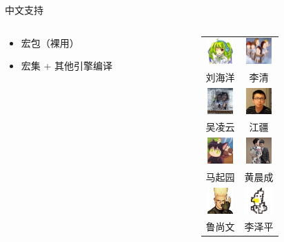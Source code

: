 \begin{frame}{中文支持}
\begin{columns}
\begin{column}{0.65\textwidth}
\begin{itemize}
      \begin{itemize}
        \item {} 宏包（裸用）
        \item {} 宏集 + 其他引擎编译
      \end{itemize}
  \end{itemize}
\end{column} \pause
\begin{column}{0.33\textwidth}
  \tiny
  \begin{tabular}{cc}
    \includegraphics[width=1cm]{figures/leoliu.png}        &
    \includegraphics[width=1cm]{figures/qinglee.jpg}       \\
    刘海洋 & 李清 \\[2ex]
    \includegraphics[width=1cm]{figures/wulingyun.jpg}     &
    \includegraphics[width=1cm]{figures/jjgod.jpg}         \\
    吴凌云 & 江疆 \\[2ex]
    \includegraphics[width=1cm]{figures/li-a-ling.jpg}     &
    \includegraphics[width=1cm]{figures/liam-huang.jpg}    \\
    马起园 & 黄晨成 \\[2ex]
    \includegraphics[width=1cm]{figures/louisstuart96.jpg} &
    \includegraphics[width=1cm]{figures/zepinglee.jpg}     \\
    鲁尚文 & 李泽平
  \end{tabular}
\end{column}
\end{columns}
\end{frame}

